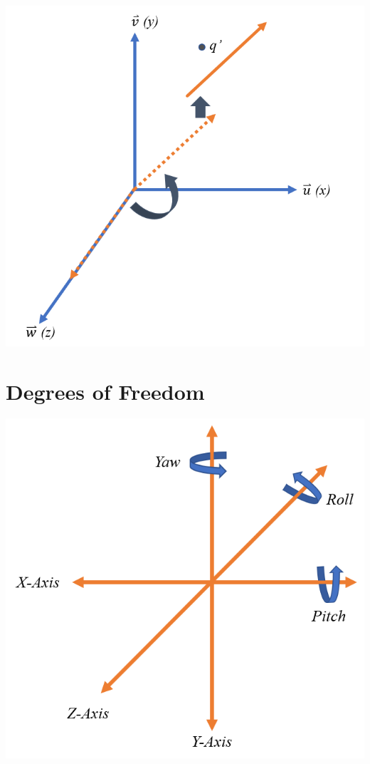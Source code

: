\documentclass[12pt,letterpaper]{article}
\begin{document}
\begin{center}
\includegraphics[scale=0.75]{rot6}
\end{center}

\section{Degrees of Freedom}
\begin{center}
\includegraphics[scale=0.75]{DOF}
\end{center}
\end{document}
